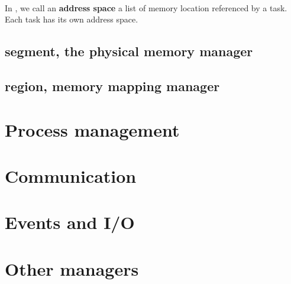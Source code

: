 \paragraph{}
In  \kaneton, we  call  an  \textbf{address space}  a  list of  memory
location referenced by a task. Each task has its own address space.

\subsection*{segment, the physical memory manager}

\subsection*{region, memory mapping manager}

\section{Process management}

\section{Communication}

\section{Events and I/O}

\section{Other managers}

